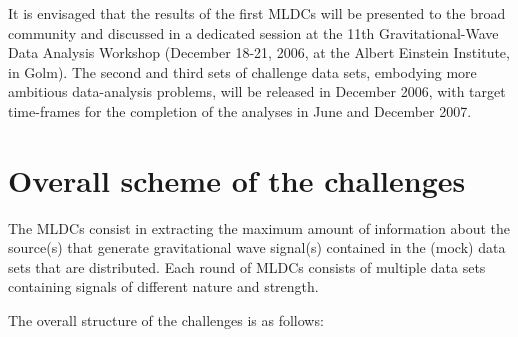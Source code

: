 \documentclass[11pt]{report}
\begin{document}
It is envisaged that the results of the first MLDCs will be presented to the broad community and discussed in a dedicated session at the 11th Gravitational-Wave Data Analysis Workshop (December 18-21, 2006, at the Albert Einstein Institute, in Golm). The second and third sets of challenge data sets, embodying more ambitious data-analysis problems, will be released in December 2006, with target time-frames for the completion of the analyses in June and December 2007. 

\section{Overall scheme of the challenges}

The MLDCs consist in extracting the maximum amount of information about the source(s) that generate gravitational wave signal(s) contained in the (mock) data sets that are distributed. Each round of MLDCs consists of multiple data sets containing signals of different nature and strength.

The overall structure of the challenges is as follows:
\end{document}
